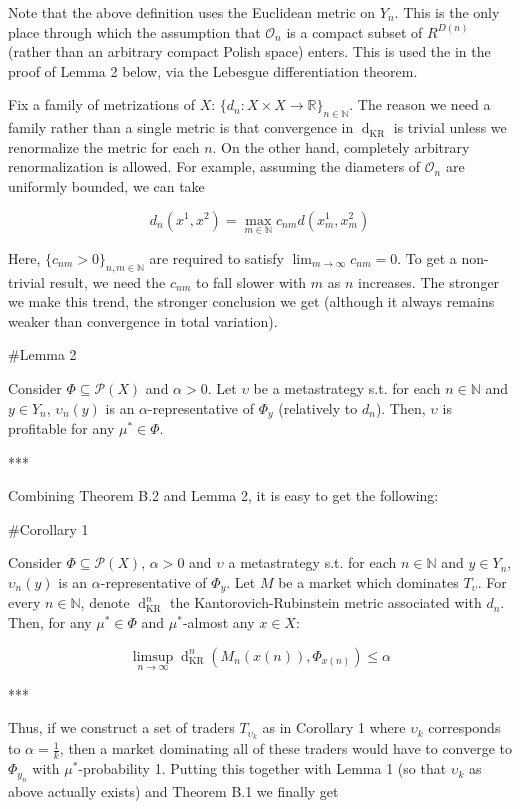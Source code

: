 \documentclass[a4paper]{article}
\newcommand{\Nats}{\mathbb{N}}
\newcommand{\Reals}{\mathbb{R}}
\newcommand{\Prob}{\mathcal{P}}
\newcommand{\Ob}{\mathcal{O}}
\newcommand{\Dkr}{\operatorname{d}_{\text{KR}}}
\begin{document}
Note that the above definition uses the Euclidean metric on ${Y_n}$. This is the only place through which the assumption that ${\Ob_n}$ is a compact subset of ${R^{D(n)}}$ (rather than an arbitrary compact Polish space) enters. This is used the in the proof of Lemma 2 below, via the Lebesgue differentiation theorem.

Fix a family of metrizations of ${X}$: ${\{d_n: X \times X \rightarrow \Reals\}_{n \in \Nats}}$. The reason we need a family rather than a single metric is that convergence in ${\Dkr}$ is trivial unless we renormalize the metric for each ${n}$. On the other hand, completely arbitrary renormalization is allowed. For example, assuming the diameters of $\Ob_n$ are uniformly bounded, we can take 

$$d_n(x^1,x^2)= \max_{m \in \Nats} c_{nm} d(x^1_m,x^2_m)$$

Here, ${\{c_{nm} > 0\}_{n,m \in \Nats}}$ are required to satisfy ${\lim_{m \rightarrow \infty} c_{nm} = 0}$. To get a non-trivial result, we need the ${c_{nm}}$ to fall slower with ${m}$ as ${n}$ increases. The stronger we make this trend, the stronger conclusion we get (although it always remains weaker than convergence in total variation).

\#Lemma 2

Consider ${\Phi \subseteq \Prob(X)}$ and ${\alpha > 0}$. Let ${\upsilon}$ be a metastrategy s.t. for each ${n \in \Nats}$ and ${y \in Y_n}$, ${\upsilon_n(y)}$ is an $\alpha$-representative of ${\Phi_y}$ (relatively to $d_n$). Then, ${\upsilon}$ is profitable for any ${\mu^* \in \Phi}$.

***

Combining Theorem B.2 and Lemma 2, it is easy to get the following:

\#Corollary 1

Consider ${\Phi \subseteq \Prob(X)}$, ${\alpha > 0}$ and ${\upsilon}$ a metastrategy s.t. for each ${n \in \Nats}$ and ${y \in Y_n}$, ${\upsilon_n(y)}$ is an $\alpha$-representative of ${\Phi_y}$. Let ${M}$ be a market which dominates ${T_\upsilon}$. For every ${n \in \Nats}$, denote ${\Dkr^n}$ the Kantorovich-Rubinstein metric associated with ${d_n}$. Then, for any ${\mu^* \in \Phi}$ and ${\mu^*}$-almost any ${x \in X}$:

$$\limsup_{n \rightarrow \infty} \Dkr^n(M_n(x(n)),\Phi_{x(n)}) \leq \alpha$$

***

Thus, if we construct a set of traders ${T_{\upsilon_k}}$ as in Corollary 1 where ${\upsilon_k}$ corresponds to ${\alpha=\frac{1}{k}}$, then a market dominating all of these traders would have to converge to ${\Phi_{y_n}}$ with ${\mu^*}$-probability 1. Putting this together with Lemma 1 (so that ${\upsilon_k}$ as above actually exists) and Theorem B.1 we finally get
\end{document}
